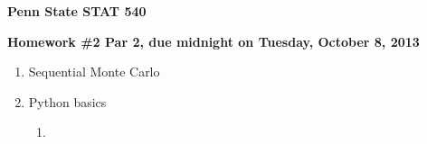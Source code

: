 \documentclass[10pt]{article}
\begin{document}
\begin{center}
{\bf Penn State STAT 540}

{\bf Homework \#2 Par 2, due midnight on Tuesday, October 8, 2013}\\
\begin{enumerate}
\item Sequential Monte Carlo
\item Python basics
\begin{enumerate}
\item 
\end{enumerate}
\end{enumerate}

\end{center}

\end{document}
